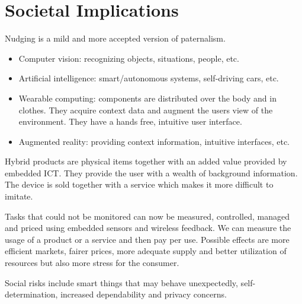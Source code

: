 \section{Societal Implications}
\begin{mytitle}[Nudging] Nudging is a mild and more accepted version of paternalism.
\end{mytitle}
\begin{mytitle}\hfill
\begin{itemize}
    \item Computer vision: recognizing objects, situations, people, etc.
    \item Artificial intelligence: smart/autonomous systems, self-driving cars, etc.
    \item Wearable computing: components are distributed over the body and in clothes. They acquire context data and augment the users view of the environment. They have a hands free, intuitive user interface.
    \item Augmented reality: providing context information, intuitive interfaces, etc.
\end{itemize}
\end{mytitle}
\begin{mytitle} Hybrid products are physical items together with an added value provided by embedded ICT. They provide the user with a wealth of background information. The device is sold together with a service which makes it more difficult to imitate.
\end{mytitle}
\begin{mytitle} Tasks that could not be monitored can now be measured, controlled, managed and priced using embedded sensors and wireless feedback. We can measure the usage of a product or a service and then pay per use. Possible effects are more efficient markets, fairer prices, more adequate supply and better utilization of resources but also more stress for the consumer.
\end{mytitle}
\begin{mytitle} Social risks include smart things that may behave unexpectedly, self-determination, increased dependability and privacy concerns.
\end{mytitle}